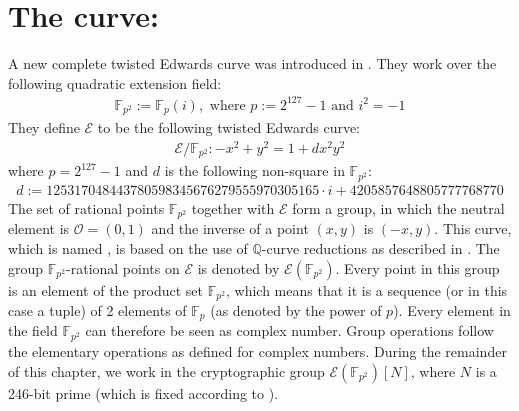 \section{\texorpdfstring{The curve: \fourq}{The Curve FourQ}}
A new complete twisted Edwards curve was introduced in \cite{costello2015fourq}.
They work over the following quadratic extension field:
%
\begin{align*}
\mathbb{F}_{p^2} := \mathbb{F}_p(i), \text{ where } p := 2^{127} - 1 \text{ and } i^2 = -1
\end{align*}
%
They define $\mathcal{E}$ to be the following twisted Edwards curve:
\begin{align*}
\mathcal{E} \slash \mathbb{F}_{p^2} : -x^2 + y^2 = 1 + dx^2 y^2
\end{align*}
where $p = 2^{127} - 1$ and $d$ is the following non-square in $\mathbb{F}_{p^2}$:
%
\begin{align*}
d := 125317048443780598345676279555970305165 \cdot i + 4205857648805777768770
\end{align*}
%
The set of rational points $\mathbb{F}_{p^2}$ together with $\mathcal{E}$ form a group, in which the neutral element is $\mathcal{O} = (0, 1)$ and the inverse of a point $(x, y)$ is $(-x, y)$.
This curve, which is named \fourq, is based on the use of $\mathbb{Q}$-curve reductions as described in \cite{smith2016mathbb}. 
The group $\mathbb{F}_{p^2}$-rational points on $\mathcal{E}$ is denoted by $\mathcal{E}(\mathbb{F}_{p^2})$.
Every point in this group is an element of the product set $\mathbb{F}_{p^2}$, which means that it is a sequence (or in this case a tuple) of 2 elements of $\mathbb{F}_{p}$ (as denoted by the power of $p$).
Every element in the field $\mathbb{F}_{p^2}$ can therefore be seen as complex number.
Group operations follow the elementary operations as defined for complex numbers. 
During the remainder of this chapter, we work in the cryptographic group $\mathcal{E}(\mathbb{F}_{p^2}) \left[ N \right]$, where $N$ is a 246-bit prime (which is fixed according to \cite[Equation 2]{costello2015fourq}).

